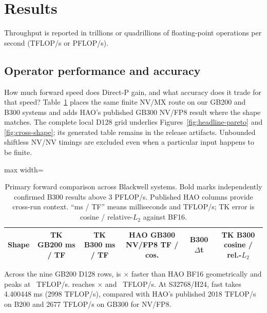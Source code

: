 \section{Results}

Throughput is reported in trillions or quadrillions of floating-point
operations per second (TFLOP/s or PFLOP/s).

\subsection{Operator performance and accuracy}

How much forward speed does Direct-P gain, and what accuracy does it trade for
that speed?  Table~\ref{tab:primary-results} places the same finite NV/MX route
on our GB200 and B300 systems and adds HAO's published GB300 NV/FP8 result
where the shape matches.  The complete local D128 grid underlies
Figures~\ref{fig:headline-pareto} and \ref{fig:cross-shape}; its generated
table remains in the release artifacts.  Unbounded shiftless NV/NV timings are
excluded even when a particular input happens to be finite.

\begin{table}[htbp]
\centering
\caption{Primary forward comparison across Blackwell systems.  Bold marks
independently confirmed B300 results above 3 PFLOP/s.  Published HAO columns
provide cross-run context.  ``ms / TF'' means milliseconds and TFLOP/s; TK
error is cosine / relative-$L_2$ against BF16.}
\label{tab:primary-results}
\begingroup
\small
\setlength{\tabcolsep}{4pt}
\begin{adjustbox}{max width=\textwidth}
\begin{tabular}{lccccc}
\toprule
Shape & TK GB200 ms / TF & TK B300 ms / TF & HAO GB300 NV/FP8 TF / cos.
& B300 $\Delta$t & TK B300 cosine / rel.-$L_2$ \\
\midrule
%
\end{tabular}
\end{adjustbox}
\endgroup
\end{table}

Across the nine GB200 D128 rows,  is
\HaoGridFastGeoSpeedup$\times$ faster than HAO BF16 geometrically and peaks
at \HaoGridFastPeakTflops\ TFLOP/s.  reaches
\HaoGridAccurateGeoSpeedup$\times$ and \HaoGridAccuratePeakTflops\ TFLOP/s.
At S32768/H24, fast takes 4.400448 ms (2998 TFLOP/s), compared with HAO's
published 2018 TFLOP/s on B200 and 2677 TFLOP/s on GB300 for NV/FP8.

